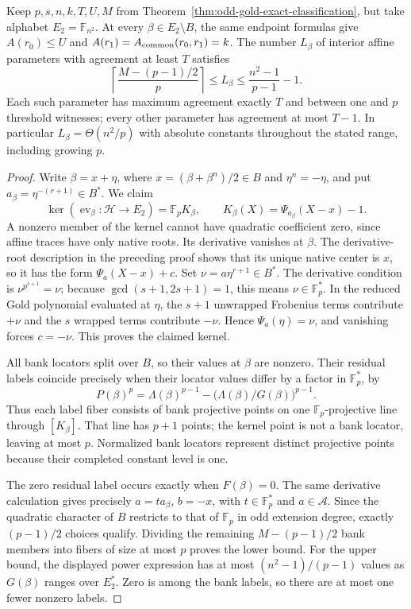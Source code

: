 \begin{corollary}\label{cor:odd-gold-quadratic-kernel}
Keep $p,s,n,k,T,U,M$ from
Theorem~\ref{thm:odd-gold-exact-classification}, but take alphabet
$E_2=\mathbb F_{n^2}$. At every $\beta\in E_2\setminus B$, the
same endpoint formulas give $A(r_0)\le U$ and
$A(r_1)=A_{\rm common}(r_0,r_1)=k$. The number $L_\beta$ of
interior affine parameters with agreement at least $T$ satisfies
\[
 \left\lceil\frac{M-(p-1)/2}{p}\right\rceil
 \le L_\beta\le\frac{n^2-1}{p-1}-1.
\]
Each such parameter has maximum agreement exactly $T$ and between
one and $p$ threshold witnesses; every other parameter has agreement
at most $T-1$. In particular $L_\beta=\Theta(n^2/p)$ with absolute
constants throughout the stated range, including growing $p$.
\end{corollary}
\begin{proof}
Write $\beta=x+\eta$, where $x=(\beta+\beta^n)/2\in B$ and
$\eta^n=-\eta$, and put
$a_\beta=\eta^{-(r+1)}\in B^*$. We claim
\[
 \ker(\operatorname{ev}_\beta:\mathcal H\longrightarrow E_2)
   =\mathbb F_p K_\beta,\qquad
 K_\beta(X)=\Psi_{a_\beta}(X-x)-1.
\]
A nonzero member of the kernel cannot have quadratic coefficient
zero, since affine traces have only native roots.
Its derivative vanishes at $\beta$. The derivative-root description
in the preceding proof shows that its unique native center is $x$,
so it has the form $\Psi_a(X-x)+c$.
Set $\nu=a\eta^{r+1}\in B^*$.
The derivative condition is $\nu^{p^{s+1}}=\nu$; because
$\gcd(s+1,2s+1)=1$, this means $\nu\in\mathbb F_p^*$.
In the reduced Gold polynomial evaluated at $\eta$, the $s+1$
unwrapped Frobenius terms contribute $+\nu$ and the $s$ wrapped
terms contribute $-\nu$. Hence $\Psi_a(\eta)=\nu$, and vanishing
forces $c=-\nu$. This proves the claimed kernel.

All bank locators split over $B$, so their values at $\beta$ are
nonzero. Their residual labels coincide precisely when their
locator values differ by a factor in $\mathbb F_p^*$, by
\[
 P(\beta)^p
 =\Lambda(\beta)^{p-1}
   -\bigl(\Lambda(\beta)/G(\beta)\bigr)^{p-1}.
\]
Thus each label fiber consists of bank projective points on one
$\mathbb F_p$-projective line through $[K_\beta]$. That line has
$p+1$ points; the kernel point is not a bank locator, leaving at
most $p$. Normalized bank locators represent distinct projective
points because their completed constant level is one.

The zero residual label occurs exactly when $F(\beta)=0$.
The same derivative calculation gives precisely
$a=t a_\beta$, $b=-x$, with $t\in\mathbb F_p^*$ and
$a\in\mathcal A$. Since the quadratic character of $B$ restricts
to that of $\mathbb F_p$ in odd extension degree, exactly
$(p-1)/2$ choices qualify. Dividing the remaining $M-(p-1)/2$
bank members into fibers of size at most $p$ proves the lower bound.
For the upper bound, the displayed power expression has at most
$(n^2-1)/(p-1)$ values as $G(\beta)$ ranges over $E_2^*$.
Zero is among the bank labels, so there are at most one fewer
nonzero labels.


\end{proof}
